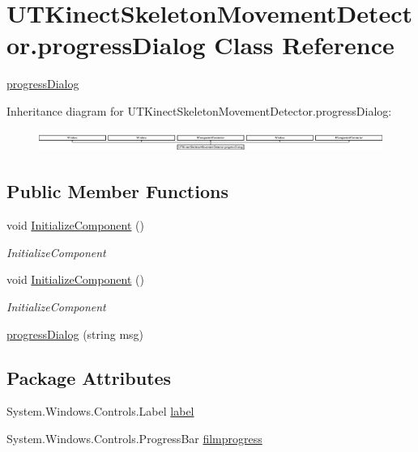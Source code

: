 \hypertarget{classUTKinectSkeletonMovementDetector_1_1progressDialog}{\section{U\-T\-Kinect\-Skeleton\-Movement\-Detector.\-progress\-Dialog Class Reference}
\label{classUTKinectSkeletonMovementDetector_1_1progressDialog}
}


\hyperlink{classUTKinectSkeletonMovementDetector_1_1progressDialog}{progress\-Dialog}  


Inheritance diagram for U\-T\-Kinect\-Skeleton\-Movement\-Detector.\-progress\-Dialog\-:\begin{figure}[H]
\begin{center}
\leavevmode
\includegraphics[height=0.713376cm]{classUTKinectSkeletonMovementDetector_1_1progressDialog}
\end{center}
\end{figure}
\subsection*{Public Member Functions}
\begin{DoxyCompactItemize}
\item 
void \hyperlink{classUTKinectSkeletonMovementDetector_1_1progressDialog_ad67bc7d8762e3496e8d812bdea3946ff}{Initialize\-Component} ()
\begin{DoxyCompactList}\small\item\em Initialize\-Component \end{DoxyCompactList}\item 
void \hyperlink{classUTKinectSkeletonMovementDetector_1_1progressDialog_ad67bc7d8762e3496e8d812bdea3946ff}{Initialize\-Component} ()
\begin{DoxyCompactList}\small\item\em Initialize\-Component \end{DoxyCompactList}\item 
\hyperlink{classUTKinectSkeletonMovementDetector_1_1progressDialog_ab99cb0504b3fb6d18cedcaa82c627f4c}{progress\-Dialog} (string msg)
\end{DoxyCompactItemize}
\subsection*{Package Attributes}
\begin{DoxyCompactItemize}
\item 
System.\-Windows.\-Controls.\-Label \hyperlink{classUTKinectSkeletonMovementDetector_1_1progressDialog_a34d8fd1e77c9e7cbc95fc31afd0223c1}{label}
\item 
System.\-Windows.\-Controls.\-Progress\-Bar \hyperlink{classUTKinectSkeletonMovementDetector_1_1progressDialog_a4c26b817c4d2e43742f7fce7c300fe73}{filmprogress}
\end{DoxyCompactItemize}
